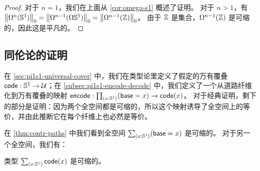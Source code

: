 \begin{proof}
对于 $n=1$，我们在上面从 \cref{cor:omega-s1} 概述了证明。
对于 $n > 1$，有 $\trunc 0 {\Omega^{n}(\Sn ^1)} = \trunc 0 {\Omega^{n-1}(\Omega{\Sn ^1})} = \trunc 0 {\Omega^{n-1}(\Z)}$。
由于 $\Z$ 是集合，$\Omega^{n-1}(\Z)$ 是可缩的，因此这是平凡的。
\end{proof}

%

\subsection{同伦论的证明}
\label{subsec:pi1s1-homotopy-theory}

在 \cref{sec:pi1s1-universal-cover} 中，我们在类型论里定义了假定的万有覆叠 $\code:\Sn^1\to\type$；在 \cref{subsec:pi1s1-encode-decode} 中，我们定义了一个从道路纤维化到万有覆叠的映射 $\encode : \prd{x:\Sn^1} (\base=x) \to \code(x)$。
对于经典证明，剩下的部分是证明：因为两个全空间都是可缩的，所以这个映射诱导了全空间上的等价，并由此推断它在每个纤维上也必然是等价。

%
在 \cref{thm:contr-paths} 中我们看到全空间 $\sm{x:\Sn^1} (\base=x)$ 是可缩的。
对于另一个全空间，我们有：

\begin{lem}\label{thm:iscontr-s1cover}
  类型 $\sm{x:\Sn^1}\code(x)$ 是可缩的。
\end{lem}

